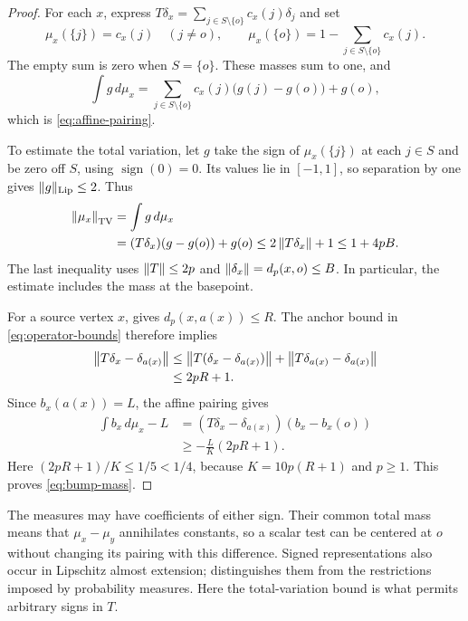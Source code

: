 \begin{proof}
For each $x$, express
$T\delta_x=\sum_{j\in S\setminus\{o\}}c_x(j)\delta_j$ and set
\[
 \mu_x(\{j\})=c_x(j)\quad(j\ne o),\qquad
 \mu_x(\{o\})=1-\sum_{j\in S\setminus\{o\}}c_x(j).
\]
The empty sum is zero when $S=\{o\}$. These masses sum to one, and
\[
 \int g\,d\mu_x
 =\sum_{j\in S\setminus\{o\}}c_x(j)\bigl(g(j)-g(o)\bigr)+g(o),
\]
which is \eqref{eq:affine-pairing}.

To estimate the total variation, let $g$ take the sign of
$\mu_x(\{j\})$ at each $j\in S$ and be zero off $S$, using
$\operatorname{sign}(0)=0$. Its values lie in $[-1,1]$, so separation by one gives
$\|g\|_{\mathrm{Lip}}\le2$. Thus
\[
 \begin{split}
 \left\|\mu_x\right\|_{\mathrm{TV}}
 &=\int g\,d\mu_x\\
 &=(T\delta_x)(g-g(o))+g(o)
 \le2\left\|T\delta_x\right\|+1
 \le1+4pB.
 \end{split}
\]
The last inequality uses $\left\|T\right\|\le2p$ and
$\left\|\delta_x\right\|=d_p(x,o)\le B$. In particular, the estimate includes
the mass at the basepoint.

For a source vertex $x$,  gives
$d_p(x,a(x))\le R$. The anchor bound in \eqref{eq:operator-bounds}
therefore implies
\[
 \begin{split}
 \left\|T\delta_x-\delta_{a(x)}\right\|
 &\le\left\|T(\delta_x-\delta_{a(x)})\right\|
       +\left\|T\delta_{a(x)}-\delta_{a(x)}\right\|\\
 &\le2pR+1.
 \end{split}
\]
Since $b_x(a(x))=L$, the affine pairing gives
\[
 \begin{split}
 \int b_x\,d\mu_x-L
 &=(T\delta_x-\delta_{a(x)})(b_x-b_x(o))\\
 &\ge-\frac{L}{K}(2pR+1).
 \end{split}
\]
Here $(2pR+1)/K\le1/5<1/4$, because $K=10p(R+1)$ and $p\ge1$.
This proves \eqref{eq:bump-mass}.
\end{proof}

The measures may have coefficients of either sign. Their common total
mass means that $\mu_x-\mu_y$ annihilates constants, so a scalar test
can be centered at $o$ without changing its pairing with this difference.
Signed representations also occur in Lipschitz almost extension;
\cite[Proposition~6 and Remark~7]{Naor21} distinguishes them from the
restrictions imposed by probability measures. Here the total-variation
bound is what permits arbitrary signs in $T$.
